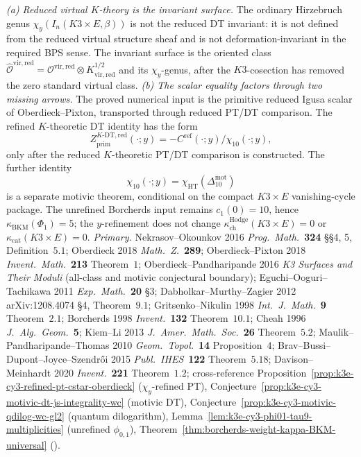 \begin{remark}
\label{rem:k3e-cy3-ktheoretic-dt}
\emph{(a) Reduced virtual \(K\)-theory is the invariant surface.} The
ordinary Hirzebruch genus
\(\chi_y(I_n(K3\times E,\beta))\) is not the reduced DT invariant: it is
not defined from the reduced virtual structure sheaf and is not
deformation-invariant in the required BPS sense. The invariant surface is
the oriented class
\(\widehat{\mathcal O}^{\mathrm{vir,red}}
=\mathcal O^{\mathrm{vir,red}}\otimes K_{\mathrm{vir,red}}^{1/2}\)
and its \(\chi_y\)-genus, after the \(K3\)-cosection has removed the
zero standard virtual class.
\emph{(b) The scalar equality factors through two missing arrows.} The
proved numerical input is the primitive reduced Igusa scalar of
Oberdieck--Pixton, transported through reduced PT/DT comparison. The
refined \(K\)-theoretic DT identity has the form
\[
 Z^{K\text{-DT},\mathrm{red}}_{\mathrm{prim}}(\cdot;y)
 =
 -C^{\mathrm{ref}}(\cdot;y)/\chi_{10}(\cdot;y),
\]
only after the reduced \(K\)-theoretic PT/DT comparison is constructed.
The further identity
\[
 \chi_{10}(\cdot;y)
 =
 \chi_{\mathrm{HT}}\!\left(\Delta_{10}^{\mathrm{mot}}\right)
\]
is a separate motivic theorem, conditional on the compact \(K3\times E\)
vanishing-cycle package. The unrefined Borcherds input remains
\(c_1(0)=10\), hence
\(\kappa_{\mathrm{BKM}}(\Phi_1)=5\); the \(y\)-refinement does not
change \(\kappa_{\mathrm{ch}}^{\mathrm{Hodge}}(K3\times E)=0\) or
\(\kappa_{\mathrm{cat}}(K3\times E)=0\).
\emph{Primary.} Nekrasov--Okounkov 2016 \emph{Prog.\ Math.}~\textbf{324} \S\S 4, 5, Definition~$5.1$; Oberdieck 2018 \emph{Math.\ Z.}~\textbf{289}; Oberdieck--Pixton 2018 \emph{Invent.\ Math.}~\textbf{213} Theorem~$1$; Oberdieck--Pandharipande 2016 \emph{K3 Surfaces and Their Moduli} (all-class and motivic conjectural boundary); Eguchi--Ooguri--Tachikawa 2011 \emph{Exp.\ Math.}~\textbf{20} \S 3; Dabholkar--Murthy--Zagier 2012 arXiv:1208.4074 \S 4, Theorem~$9.1$; Gritsenko--Nikulin 1998 \emph{Int.\ J.\ Math.}~\textbf{9} Theorem~$2.1$; Borcherds 1998 \emph{Invent.}~\textbf{132} Theorem~$10.1$; Cheah 1996 \emph{J.\ Alg.\ Geom.}~\textbf{5}; Kiem--Li 2013 \emph{J.\ Amer.\ Math.\ Soc.}~\textbf{26} Theorem~$5.2$; Maulik--Pandharipande--Thomas 2010 \emph{Geom.\ Topol.}~\textbf{14} Proposition~$4$; Brav--Bussi--Dupont--Joyce--Szendr\H oi 2015 \emph{Publ.\ IHES}~\textbf{122} Theorem~$5.18$; Davison--Meinhardt 2020 \emph{Invent.}~\textbf{221} Theorem~$1.2$; cross-reference Proposition~\ref{prop:k3e-cy3-refined-pt-cstar-oberdieck} ($\chi_{y}$-refined PT), Conjecture~\ref{prop:k3e-cy3-motivic-dt-js-integrality-wc} (motivic DT), Conjecture~\ref{prop:k3e-cy3-motivic-qdilog-wc-gl2} (quantum dilogarithm), Lemma~\ref{lem:k3e-cy3-phi01-tau9-multiplicities} (unrefined $\phi_{0,1}$), Theorem~\ref{thm:borcherds-weight-kappa-BKM-universal} (\cite{VolI}).
\end{remark}

